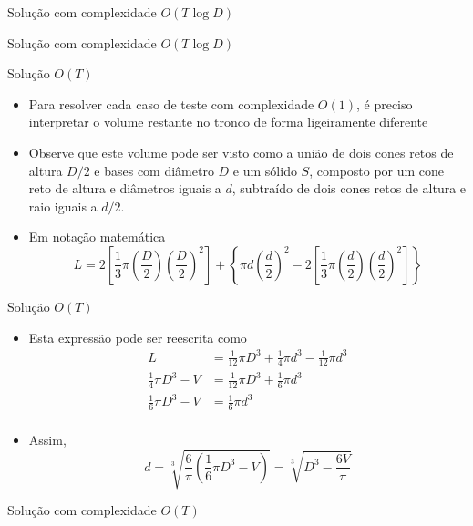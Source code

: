 \begin{frame}[fragile]{Solução com complexidade $O(T\log D)$}
\end{frame}

\begin{frame}[fragile]{Solução com complexidade $O(T\log D)$}
\end{frame}


\begin{frame}[fragile]{Solução $O(T)$}

    \begin{itemize}
        \item Para resolver cada caso de teste com complexidade $O(1)$, é preciso 
            interpretar o volume restante no tronco de forma ligeiramente diferente
        \pause

        \item Observe que este volume pode ser visto como a união de dois cones retos de 
            altura $D/2$ e bases com
            diâmetro $D$ e um sólido $S$, composto por um cone reto de altura e diâmetros iguais a
            $d$, subtraído de dois cones retos de altura e raio iguais a $d/2$.
        \pause

        \item Em notação matemática
        \[
            L = 2\left[\frac{1}{3}\pi\left(\frac{D}{2}\right)\left(\frac{D}{2}\right)^2\right]
            + \left\lbrace \pi d\left(\frac{d}{2}\right)^2 
            -2\left[\frac{1}{3}\pi\left(\frac{d}{2}\right)\left(\frac{d}{2}\right)^2\right] \right\rbrace
        \]
    \end{itemize}

\end{frame}

\begin{frame}[fragile]{Solução $O(T)$}

    \begin{itemize}
        \item Esta expressão pode ser reescrita como
        \begin{align*}
            L &= \frac{1}{12}\pi D^3 + \frac{1}{4}\pi d^3 - \frac{1}{12}\pi d^3 \\
            \frac{1}{4}\pi D^3 - V &= \frac{1}{12}\pi D^3 + \frac{1}{6}\pi d^3 \\
            \frac{1}{6}\pi D^3 - V &= \frac{1}{6}\pi d^3 \\
        \end{align*}
        \pause
 
        \item Assim,
        \[
            d = \sqrt[3]{\frac{6}{\pi}\left(\frac{1}{6}\pi D^3 - V\right)} =
            \sqrt[3]{D^3 - \frac{6V}{\pi}}
        \]
    \end{itemize}

\end{frame}

\begin{frame}[fragile]{Solução com complexidade $O(T)$}
\end{frame}
